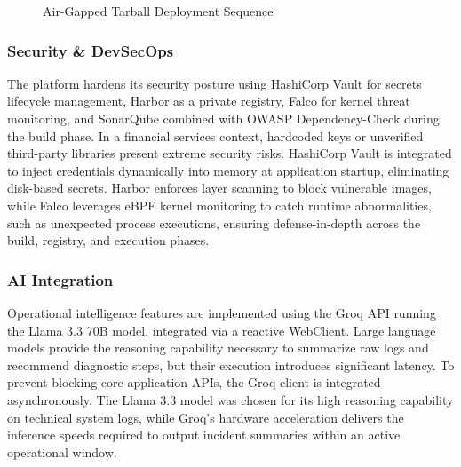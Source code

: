 \documentclass[12pt,a4paper]{report}
\begin{document}
\begin{figure}[H]
  \centering
  \caption{Air-Gapped Tarball Deployment Sequence}
  \label{fig:airgapped_deploy}
\end{figure}

\subsubsection{Security \& DevSecOps}
The platform hardens its security posture using HashiCorp Vault for secrets lifecycle management, Harbor as a private registry, Falco for kernel threat monitoring, and SonarQube combined with OWASP Dependency-Check during the build phase. In a financial services context, hardcoded keys or unverified third-party libraries present extreme security risks. HashiCorp Vault is integrated to inject credentials dynamically into memory at application startup, eliminating disk-based secrets. Harbor enforces layer scanning to block vulnerable images, while Falco leverages eBPF kernel monitoring to catch runtime abnormalities, such as unexpected process executions, ensuring defense-in-depth across the build, registry, and execution phases.

\subsubsection{AI Integration}
Operational intelligence features are implemented using the Groq API running the Llama 3.3 70B model, integrated via a reactive WebClient. Large language models provide the reasoning capability necessary to summarize raw logs and recommend diagnostic steps, but their execution introduces significant latency. To prevent blocking core application APIs, the Groq client is integrated asynchronously. The Llama 3.3 model was chosen for its high reasoning capability on technical system logs, while Groq's hardware acceleration delivers the inference speeds required to output incident summaries within an active operational window.
\end{document}
